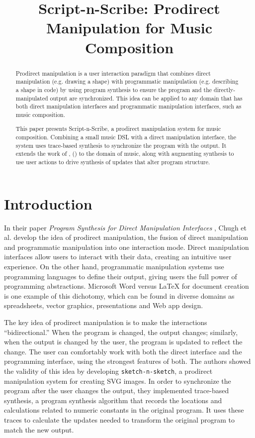 \documentclass[nocopyrightspace,numbers,10pt]{sigplanconf}
\newcommand{\sketch}{\texttt{sketch-n-sketch}}
\newcommand{\sns}{Script-n-Scribe}
\begin{document}
\title{Script-n-Scribe: Prodirect Manipulation for Music Composition}
\maketitle

\begin{abstract}
  \label{abstract}
  Prodirect manipulation is a user interaction paradigm that combines direct
  manipulation (e.g. drawing a shape) with programmatic manipulation (e.g.
  describing a shape in code) by using program synthesis to ensure the program
  and the directly-manipulated output are synchronized. This idea can be applied
  to any domain that has both direct manipulation interfaces and programmatic
  manipulation interfaces, such as music composition.

  This paper presents \sns, a prodirect manipulation system for music
  composition. Combining a small music DSL with a direct manipulation interface,
  the system uses trace-based synthesis to synchronize the program with the
  output. It extends the work of \citeauthor{prodir}, 
  (\citeyear{prodir}) to the domain of music, along with augmenting synthesis to
  use user actions to drive synthesis of updates that alter program structure.
\end{abstract}

\section{Introduction}
\label{sec:intro}

In their paper \emph{Program Synthesis for Direct Manipulation Interfaces}
\cite{prodir}, Chugh et al. develop the idea of prodirect manipulation,
the fusion of direct manipulation and programmatic manipulation into one
interaction mode. Direct manipulation interfaces allow users to interact with
their data, creating an intuitive user experience. On the other hand,
programmatic manipulation systems use programming languages to define their
output, giving users the full power of programming abstractions. Microsoft Word
versus \LaTeX{} for document creation is one example of this dichotomy, which
can be found in diverse domains as spreadsheets, vector graphics, presentations
and Web app design.

The key idea of prodirect manipulation is to make the interactions
``bidirectional.'' When the program is changed, the output changes; similarly,
when the output is changed by the user, the program is updated to reflect the
change. The user can comfortably work with both the direct interface and the
programming interface, using the strongest features of both. The authors showed
the validity of this idea by developing \sketch{}, a prodirect manipulation
system for creating SVG images. In order to synchronize the program after the
user changes the output, they implemented trace-based synthesis, a program
synthesis algorithm that records the locations and calculations related to
numeric constants in the original program. It uses these traces to calculate the
updates needed to transform the original program to match the new output.
\end{document}

